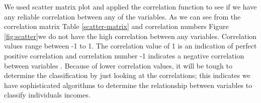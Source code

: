 \documentclass[sigconf]{acmart}
\begin{document}
\par We used scatter matrix plot and applied the correlation function to see if we have any reliable correlation between any of the variables. As we can see from the correlation matrix Table \ref{scatter-matrix} and correlation numbers Figure \ref{fig:scatter}we do not have the high correlation between any variables. Correlation values range between -1 to 1. The correlation value of 1 is an indication of perfect positive correlation and correlation number -1 indicates a negative correlation between variables \cite{www-investopedia}. Because of lower correlation values, it will be tough to determine the classification by just looking at the correlations; this indicates we have sophisticated algorithms to determine the relationship between variables to classify individuals incomes. 

\begin{table}[!ht]
\centering
{}
\caption{Correlation Matrix \cite{Borga2017}.}
\label{scatter-matrix}
\end{table}
\end{document}
